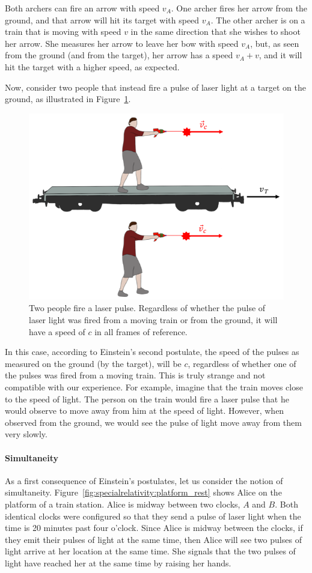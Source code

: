 Both archers can fire an arrow with speed $v_A$. One archer fires her arrow from the ground, and that arrow will hit its target with speed $v_A$. The other archer is on a train that is moving with speed $v$ in the same direction that she wishes to shoot her arrow. She measures her arrow to leave her bow with speed $v_A$, but, as seen from the ground (and from the target), her arrow has a speed $v_A+v$, and it will hit the target with a higher speed, as expected.

Now, consider two people that instead fire a pulse of laser light at a target on the ground, as illustrated in Figure~\ref{fig:specialrelativity:laser}.

\begin{figure}[!htbp]
\centering
\includegraphics[width=0.5\linewidth]{files/laser-5fee8c8b50f80a779a31bd60586c2636.png}
\caption[]{Two people fire a laser pulse. Regardless of whether the pulse of laser light was fired from a moving train or from the ground, it will have a speed of $c$ in all frames of reference.}
\label{fig:specialrelativity:laser}
\end{figure}

In this case, according to Einstein's second postulate, the speed of the pulses as measured on the ground (by the target), will be $c$, regardless of whether one of the pulses was fired from a moving train. This is truly strange and not compatible with our experience. For example, imagine that the train moves close to the speed of light. The person on the train would fire a laser pulse that he would observe to move away from him at the speed of light. However, when observed from the ground, we would see the pulse of light move away from them very slowly.

\paragraph{Simultaneity}

As a first consequence of Einstein's postulates, let us consider the notion of simultaneity. Figure~\ref{fig:specialrelativity:platform_rest} shows Alice on the platform of a train station. Alice is midway between two clocks, $A$ and $B$. Both identical clocks were configured so that they send a pulse of laser light when the time is 20 minutes past four o'clock. Since Alice is midway between the clocks, if they emit their pulses of light at the same time, then Alice will see two pulses of light arrive at her location at the same time. She signals that the two pulses of light have reached her at the same time by raising her hands.


